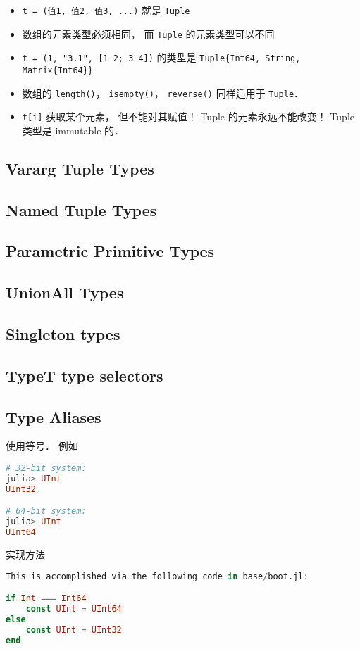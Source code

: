 \begin{itemize}
\item \verb|t = (值1, 值2, 值3, ...)| 就是 \verb|Tuple|
\item 数组的元素类型必须相同， 而 \verb|Tuple| 的元素类型可以不同
\item \verb|t = (1, "3.1", [1 2; 3 4])| 的类型是 \verb|Tuple{Int64, String, Matrix{Int64}}|
\item 数组的 \verb|length()|， \verb|isempty()|， \verb|reverse()| 同样适用于 \verb|Tuple|．
\item \verb|t[i]| 获取某个元素， 但不能对其赋值！ Tuple 的元素永远不能改变！ Tuple 类型是 immutable 的．
\end{itemize}


\subsection{Vararg Tuple Types}

\subsection{Named Tuple Types}

\subsection{Parametric Primitive Types}

\subsection{UnionAll Types}

\subsection{Singleton types}

\subsection{Type{T} type selectors}

\subsection{Type Aliases}
使用等号． 例如
\begin{lstlisting}[language=julia]
# 32-bit system:
julia> UInt
UInt32

# 64-bit system:
julia> UInt
UInt64
\end{lstlisting}
实现方法
\begin{lstlisting}[language=julia]
This is accomplished via the following code in base/boot.jl:

if Int === Int64
    const UInt = UInt64
else
    const UInt = UInt32
end
\end{lstlisting}

